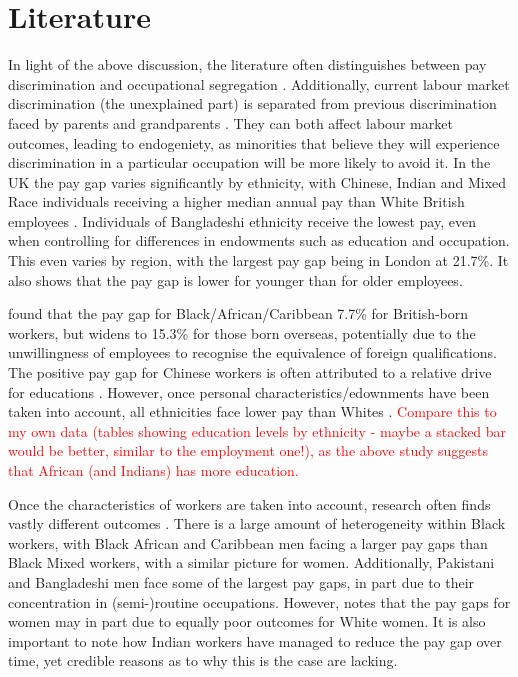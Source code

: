 \documentclass[class=article, crop=false]{standalone}
\begin{document}
\section{Literature}
\label{sec:Literature}
In light of the above discussion, the literature often distinguishes between pay discrimination and occupational segregation \citep{Brynin}. Additionally, current labour market discrimination (the unexplained part) is separated from previous discrimination faced by parents and grandparents \citep{Lundberg}. They can both affect labour market outcomes, leading to endogeniety, as minorities that believe they will experience discrimination in a particular occupation will be more likely to avoid it.
In the UK the pay gap varies significantly by ethnicity, with Chinese, Indian and Mixed Race individuals receiving a higher median annual pay than White British employees \citep{ONSe}. Individuals of Bangladeshi ethnicity receive the lowest pay, even when controlling for differences in endowments such as education and occupation. This even varies by region, with the largest pay gap being in London at 21.7\%. It also shows that the pay gap is lower for younger than for older employees.

\citep{Berthoud} found that the pay gap for Black/African/Caribbean 7.7\% for British-born workers, but widens to 15.3\% for those born overseas, potentially due to the unwillingness of employees to recognise the equivalence of foreign qualifications. The positive pay gap for Chinese workers is often attributed to a relative drive for educations \citep{Leslie}. However, once personal characteristics/edownments have been taken into account, all ethnicities face lower pay than Whites \citep{Metcalf}. \textcolor{red}{Compare this to my own data (tables showing education levels by ethnicity - maybe a stacked bar would be better, similar to the employment one!), as the above study suggests that African (and Indians) has more education.}

Once the characteristics of workers are taken into account, research often finds vastly different outcomes \citep{Heath}. There is a large amount of heterogeneity within Black workers, with Black African and Caribbean men facing a larger pay gaps than Black Mixed workers, with a similar picture for women. Additionally, Pakistani and Bangladeshi men face some of the largest pay gaps, in part due to their concentration in (semi-)routine occupations. However, \citep{Heath} notes that the pay gaps for women may in part due to equally poor outcomes for White women. It is also important to note how Indian workers have managed to reduce the pay gap over time, yet credible reasons as to why this is the case are lacking.
\end{document}

